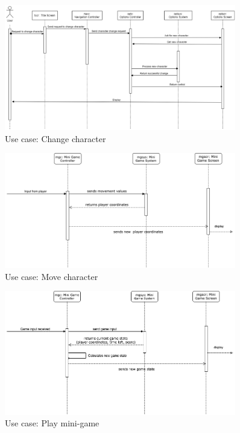 \documentclass[]{article}
\begin{document}
\begin{figure}[H]
    \centering
    \includegraphics[width=0.9\textwidth]{D3/sequenceDiagrams/change_character.png}
    \caption{Use case: Change character}
    \label{fig:seq_change_char}
\end{figure}

\begin{figure}[H]
    \centering
    \includegraphics[width=0.9\textwidth]{D3/sequenceDiagrams/move_character.png}
    \caption{Use case: Move character}
    \label{fig:seq_move_char}
\end{figure}

\begin{figure}[H]
    \centering
    \includegraphics[width=0.9\textwidth]{D3/sequenceDiagrams/play_minigame.png}
    \caption{Use case: Play mini-game}
    \label{fig:seq_play_game}
\end{figure}
\end{document}
